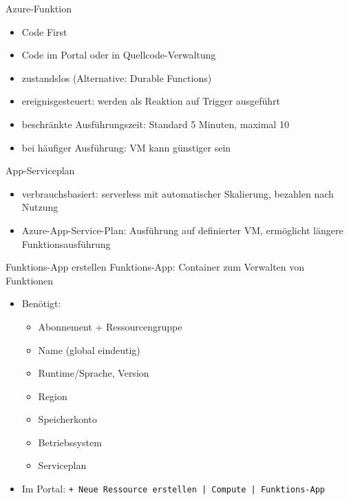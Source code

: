 \begin{flashcard}[Definition]{Azure-Funktion}
    \begin{itemize}
        \item Code First
        \item Code im Portal oder in Quellcode-Verwaltung
        \item zustandslos (Alternative: Durable Functions)
        \item ereignisgesteuert: werden als Reaktion auf Trigger ausgeführt
        \item beschränkte Ausführungszeit: Standard 5 Minuten, maximal 10
        \item bei häufiger Ausführung: VM kann günstiger sein
    \end{itemize}
\end{flashcard}

\begin{flashcard}[Definition]{App-Serviceplan}
    \begin{itemize}
        \item verbrauchsbasiert: serverless mit automatischer Skalierung, bezahlen nach Nutzung
        \item Azure-App-Service-Plan: Ausführung auf definierter VM, ermöglicht längere Funktionsausführung
    \end{itemize}
\end{flashcard}

\begin{flashcard}[Definition]{Funktions-App erstellen}
    Funktions-App: Container zum Verwalten von Funktionen
    \begin{itemize}
        \item Benötigt:
            \begin{itemize}
                \item Abonnement + Ressourcengruppe
                \item Name (global eindeutig)
                \item Runtime/Sprache, Version
                \item Region
                \item Speicherkonto
                \item Betriebssystem
                \item Serviceplan
            \end{itemize}
        \item Im Portal: \texttt{+ Neue Ressource erstellen | Compute | Funktions-App}
    \end{itemize}
\end{flashcard}

